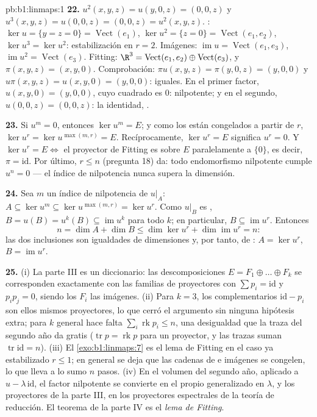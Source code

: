 \begin{solution}{pb:b1:linmaps:1}
\textbf{22.} $u^2(x,y,z) = u(y, 0, z) = (0, 0, z)$ y
$u^3(x,y,z) = u(0,0,z) = (0,0,z) = u^2(x,y,z)$. :
$\ker u = \{y = z = 0\} = \operatorname{Vect}(e_1)$,
$\ker u^2 = \{z = 0\} = \operatorname{Vect}(e_1, e_2)$,
$\ker u^3 = \ker u^2$: estabilización en $r = 2$. Imágenes:
$\operatorname{im} u = \operatorname{Vect}(e_1, e_3)$,
$\operatorname{im} u^2 = \operatorname{Vect}(e_3)$. Fitting:
$\R^3 = \operatorname{Vect}(e_1, e_2) \oplus
\operatorname{Vect}(e_3)$, y $\pi(x, y, z) = (x, y, 0)$.
Comprobación: $\pi u(x,y,z) = \pi(y, 0, z) = (y, 0, 0)$ y
$u\pi(x,y,z) = u(x, y, 0) = (y, 0, 0)$: iguales. En el primer factor,
$u(x, y, 0) = (y, 0, 0)$, cuyo cuadrado es $0$: nilpotente; y en el
segundo, $u(0,0,z) = (0,0,z)$: la identidad, .

\textbf{23.} Si $u^m = 0$, entonces $\ker u^m = E$; y como los
 están congelados a partir de $r$,
$\ker u^{r} = \ker u^{\max(m, r)} = E$. Recíprocamente,
$\ker u^{r} = E$ significa $u^{r} = 0$. Y $\ker u^{r} = E \iff$ el
proyector de Fitting es sobre $E$ paralelamente a $\{0\}$, es decir,
$\pi = \mathrm{id}$. Por último, $r \leq n$ (pregunta 18) da: todo
endomorfismo nilpotente cumple $u^{n} = 0$ --- el índice de
nilpotencia nunca supera la dimensión.

\textbf{24.} Sea $m$ un índice de nilpotencia de $u|_A$:
$A \subseteq \ker u^{m} \subseteq \ker u^{\max(m,r)} = \ker u^{r}$.
Como $u|_B$ es ,
$B = u(B) = u^{k}(B) \subseteq \operatorname{im} u^{k}$ para todo
$k$; en particular, $B \subseteq \operatorname{im} u^{r}$. Entonces
\[
n = \dim A + \dim B \leq \dim\ker u^{r} +
\dim\operatorname{im} u^{r} = n :
\]
las dos inclusiones son igualdades de dimensiones y, por tanto, de
: $A = \ker u^{r}$, $B = \operatorname{im} u^{r}$.

\textbf{25.} (i) La parte III es un diccionario: las
descomposiciones $E = F_1 \oplus \dots \oplus F_k$ se corresponden
exactamente con las familias de proyectores con
$\sum p_i = \mathrm{id}$ y $p_i p_j = 0$, siendo los $F_i$ las
imágenes. (ii) Para $k = 3$, los complementarios
$\mathrm{id} - p_i$ son ellos mismos proyectores, lo que cerró el
argumento sin ninguna hipótesis extra; para $k$ general hace falta
$\sum_i \operatorname{rk} p_i \leq n$, una desigualdad que la traza
del segundo año da gratis ($\operatorname{tr} p = \operatorname{rk}
p$ para un proyector, y las trazas suman
$\operatorname{tr} \mathrm{id} = n$). (iii) El
\cref{exo:b1:linmaps:7} es el lema de Fitting en el caso ya
estabilizado $r \leq 1$; en general se deja que las cadenas de
 e imágenes se congelen, lo que lleva a lo sumo $n$ pasos.
(iv) En el volumen del segundo año, aplicado a
$u - \lambda\, \mathrm{id}$, el factor nilpotente se convierte en el
 propio generalizado en $\lambda$, y los proyectores de la
parte III, en los proyectores espectrales de la teoría de reducción.
El teorema de la parte IV es el \emph{lema de Fitting}.
\end{solution}
